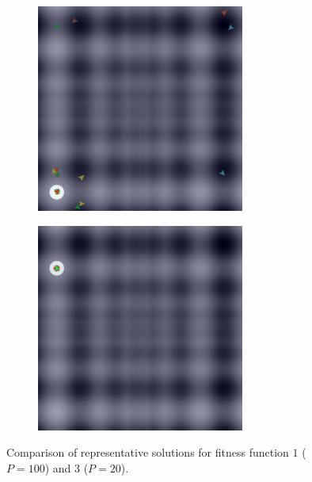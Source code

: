 \documentclass[12pt]{article}
\begin{document}
\begin{figure}[h!]
\begin{subfigure}[c]{0.5\textwidth}
\centering
\includegraphics[width=0.75\textwidth]{figures/ex5/f3-3.png}
\end{subfigure}
\begin{subfigure}[c]{0.5\textwidth}
\centering
\includegraphics[width=0.75\textwidth]{figures/ex5/f3-20.png}
\end{subfigure}
\caption{Comparison of representative solutions for fitness function $1$ ($P=100$) and $3$ ($P=20$).}
\label{fig:ex5comp}
\end{figure}

\FloatBarrier
\end{document}

